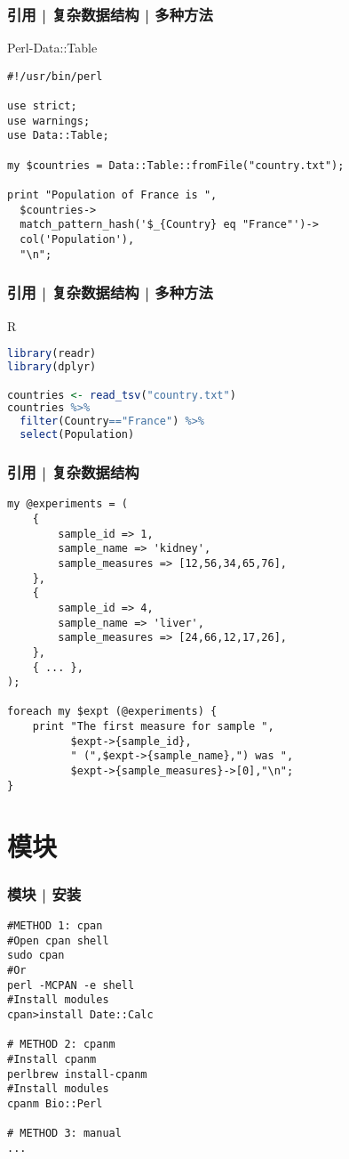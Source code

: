 \begin{frame}[fragile]
  \frametitle{引用 | 复杂数据结构 | 多种方法}
  \begin{block}{Perl-Data::Table}
\begin{lstlisting}[basicstyle=\small\tt]
#!/usr/bin/perl

use strict;
use warnings;
use Data::Table;

my $countries = Data::Table::fromFile("country.txt");

print "Population of France is ",
  $countries->
  match_pattern_hash('$_{Country} eq "France"')->
  col('Population'),
  "\n";
\end{lstlisting}
  \end{block}
\end{frame}

\begin{frame}[fragile]
  \frametitle{引用 | 复杂数据结构 | 多种方法}
  \begin{block}{R}
\begin{lstlisting}[language=r]
library(readr)
library(dplyr)

countries <- read_tsv("country.txt")
countries %>% 
  filter(Country=="France") %>% 
  select(Population)
\end{lstlisting}
  \end{block}
\end{frame}

\begin{frame}[fragile]
  \frametitle{引用 | 复杂数据结构}
\begin{lstlisting}[basicstyle=\footnotesize\tt,numberstyle=\scriptsize]
my @experiments = (
    {
        sample_id => 1,
        sample_name => 'kidney',
        sample_measures => [12,56,34,65,76],
    },
    {
        sample_id => 4,
        sample_name => 'liver',
        sample_measures => [24,66,12,17,26],
    },
    { ... },
);

foreach my $expt (@experiments) {
    print "The first measure for sample ",
          $expt->{sample_id},
          " (",$expt->{sample_name},") was ",
          $expt->{sample_measures}->[0],"\n";
}
\end{lstlisting}
\end{frame}

\section{模块}
\begin{frame}[fragile]
  \frametitle{模块 | 安装}
\begin{lstlisting}
#METHOD 1: cpan
#Open cpan shell
sudo cpan
#Or
perl -MCPAN -e shell
#Install modules
cpan>install Date::Calc

# METHOD 2: cpanm
#Install cpanm
perlbrew install-cpanm
#Install modules
cpanm Bio::Perl

# METHOD 3: manual
...
\end{lstlisting}
\end{frame}

